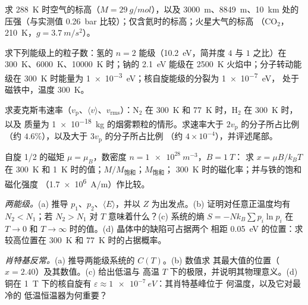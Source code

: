 \begin{exercise}[$\star$]\label{exo:b2:boltzmann-factor:1}
求 \qty{288}{K} 时空气的标高（$M = \qty{29}{g/mol}$），以及
\qty{3000}{m}、\qty{8849}{m}、\qty{10}{km} 处的压强（与实测值
\qty{0.26}{bar} 比较）；仅含氦时的标高；火星大气的标高
（CO$_2$，\qty{210}{K}，$g = \qty{3.7}{m/s^2}$）。
\end{exercise}

\begin{exercise}[$\star$]\label{exo:b2:boltzmann-factor:2}
求下列能级上的粒子数：氢的 $n = 2$ 能级（\qty{10.2}{eV}，简并度 $4$
与 $1$ 之比）在 \qty{300}{K}、\qty{6000}{K}、\qty{10000}{K} 时；钠的
\qty{2.1}{eV} 能级在 \qty{2500}{K} 火焰中；分子转动能级在
\qty{300}{K} 时能量为 \qty{1e-3}{eV}；核自旋能级的分裂为 \qty{1e-7}{eV}，
处于磁铁中，温度 \qty{300}{K}。
\end{exercise}

\begin{exercise}[$\star$]\label{exo:b2:boltzmann-factor:3}
求麦克斯韦速率（$v_{\text{p}}$、$\langle v\rangle$、$v_{\text{rms}}$）：N$_2$
在 \qty{300}{K} 和 \qty{77}{K} 时，H$_2$ 在 \qty{300}{K} 时，以及
质量为 \qty{1e-18}{kg} 的烟雾颗粒的情形。求速率大于 $2v_{\text{p}}$ 的分子所占比例
（约 $4.6\%$），以及大于 $3v_{\text{p}}$ 的分子所占比例
（约 $4 \times 10^{-4}$），并评述尾部。
\end{exercise}

\begin{exercise}[$\star$]\label{exo:b2:boltzmann-factor:4}
自旋 1/2 的磁矩 $\mu = \mu_B$，数密度 $n = \qty{1e28}{m^{-3}}$，$B = \qty{1}{T}$：
求 $x = \mu B/k_BT$ 在 \qty{300}{K} 和 \qty{1}{K} 时的值；$M/M_{\text{饱和}}$；$M_{\text{饱和}}$；
\qty{300}{K} 时的磁化率；并与铁的饱和磁化强度
（\qty{1.7e6}{A/m}）作比较。
\end{exercise}

\begin{exercise}[$\star\star$]\label{exo:b2:boltzmann-factor:5}
\emph{两能级。}(a) 推导 $p_1$、$p_2$、$\langle E\rangle$，并以 $Z$ 为出发点。(b)
证明对任意正温度均有 $N_2 < N_1$；若 $N_2 >
N_1$ 对 $T$ 意味着什么？(c) 系统的熵 $S = -Nk_B\sum p_i\ln p_i$ 在
$T \to 0$ 和 $T \to \infty$ 时的值。(d) 晶体中的缺陷可占据两个
相距 \qty{0.05}{eV} 的位置：求较高位置在
\qty{300}{K} 和 \qty{77}{K} 时的占据概率。
\end{exercise}

\begin{exercise}[$\star\star$]\label{exo:b2:boltzmann-factor:6}
\emph{肖特基反常。}(a) 推导两能级系统的 $C(T)$。(b) 数值求
其最大值的位置（$x = 2.40$）及其数值。(c) 给出低温与
高温 $T$ 下的极限，并说明其物理意义。(d) 铜在
\qty{1}{T} 下的核自旋有 $\varepsilon \approx \qty{1e-7}{eV}$：其肖特基峰位于
何温度，以及它对最冷的
低温恒温器为何重要？
\end{exercise}


